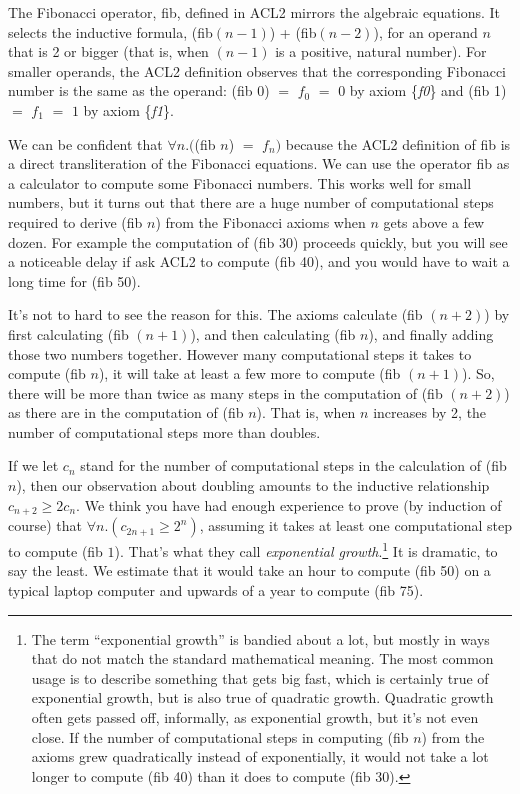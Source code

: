 The Fibonacci operator, \textsf{fib}, defined in ACL2
mirrors the algebraic equations.
It selects the inductive formula,
\textsf{(fib$(n - 1)$) + (fib$(n - 2)$)},
for an operand $n$ that is 2 or bigger
(that is, when $(n-1)$ is a positive, natural number).
For smaller operands, the ACL2 definition
observes that the corresponding Fibonacci number
is the same as the operand:
\textsf{(fib 0)} $=$ $f_0$ $=$ $0$ by axiom \{\emph{f0}\}
and \textsf{(fib 1)} $=$ $f_1$ $=$ $1$ by axiom \{\emph{f1}\}.

We can be confident that $\forall n.($\textsf{(fib $n$)} $=$ $f_n)$
because the ACL2 definition of \textsf{fib} is a direct
transliteration of the Fibonacci equations.
We can use the operator \textsf{fib} as a calculator
to compute some Fibonacci numbers.
This works well for small numbers, but it turns out that there are
a huge number of computational steps required to derive
\textsf{(fib $n$)} from the Fibonacci axioms when $n$ gets above a few dozen.
For example the computation of \textsf{(fib 30)} proceeds quickly,
but you will see a noticeable delay if ask ACL2 to compute \textsf{(fib 40)},
and you would have to wait a long time for \textsf{(fib 50)}.

It's not to hard to see the reason for this.
The axioms calculate \textsf{(fib $(n+2)$)} by first calculating
(\textsf{fib $(n+1)$)}, and then calculating \textsf{(fib $n$)}, and finally
adding those two numbers together.
However many computational steps it takes to compute \textsf{(fib $n$)},
it will take at least a few more to compute \textsf{(fib $(n+1)$)}.
So, there will be more than twice as many steps in the computation of \textsf{(fib $(n+2)$)}
as there are in the computation of \textsf{(fib $n$)}.
That is, when $n$ increases by 2, the number of computational steps more than doubles.

If we let $c_n$ stand for the number of computational steps in the calculation
of \textsf{(fib $n$)}, then our observation about doubling amounts to the
inductive relationship $c_{n+2} \geq 2c_n$.
We think you have had enough experience to prove (by induction of course)
that $\forall n.(c_{2n+1} \geq 2^n)$,
assuming it takes at least one computational step to compute \textsf{(fib $1$)}.
That's what they call \emph{exponential growth}.\footnote{The term
``exponential growth'' is bandied about a lot, but mostly
in ways that do not match the standard mathematical meaning.
The most common usage is to describe something that
gets big fast, which is certainly true of exponential growth,
but is also true of quadratic growth.
Quadratic growth often gets passed off, informally, as exponential growth,
but it's not even close. If the number of computational steps
in computing \textsf{(fib $n$)} from the axioms grew quadratically instead of exponentially,
it would not take a lot longer to compute \textsf{(fib 40)} than it does to compute \textsf{(fib 30)}.}
It is dramatic, to say the least. We estimate that it would take an hour to compute
\textsf{(fib 50)} on a typical laptop computer and upwards of a year to compute \textsf{(fib 75)}.

